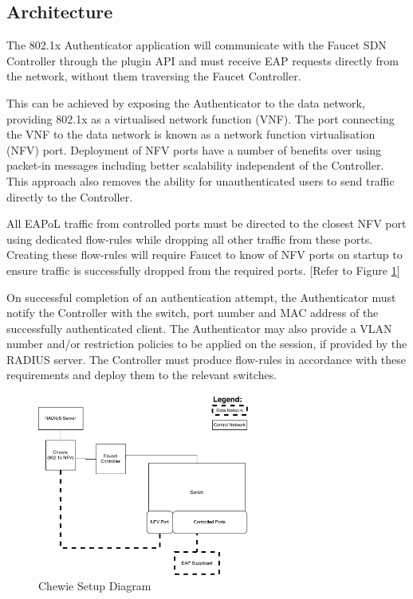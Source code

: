 \subsection{Architecture}
The 802.1x Authenticator application will communicate with the Faucet SDN Controller through the plugin API and must receive EAP requests directly from the network, without them traversing the Faucet Controller.

This can be achieved by exposing the Authenticator to the data network, providing 802.1x as a virtualised network function (VNF).
The port connecting the VNF to the data network is known as a network function virtualisation (NFV) port. Deployment of NFV ports have a number of benefits over using packet-in messages including better scalability independent of the Controller. This approach also removes the ability for unauthenticated users to send traffic directly to the Controller.

All EAPoL traffic from controlled ports must be directed to the closest NFV port using dedicated flow-rules while dropping all other traffic from these ports. Creating these flow-rules will require Faucet to know of NFV ports on startup to ensure traffic is successfully dropped from the required ports. [Refer to Figure \ref{fig:chewie_setup_diagram}]

On successful completion of an authentication attempt, the Authenticator must notify the Controller with the switch, port number and MAC address of the successfully authenticated client. The Authenticator may also provide a VLAN number and/or restriction policies to be applied on the session, if provided by the RADIUS server. The Controller must produce flow-rules in accordance with these requirements and deploy them to the relevant switches.

\begin{figure}\begin{center}
    \includegraphics[height=6cm]{images/chewie_architecture.png}
    \caption{Chewie Setup Diagram}
    \label{fig:chewie_setup_diagram}
\end{center}\end{figure}
